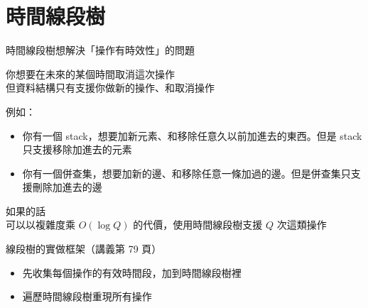 \newcommand{\InlineCode}[1]{\texttt|#1|}

\section{時間線段樹}

\iffalse

\begin{frame}{\ebtitle}
    如果要一句話解釋時間線段樹：\\
    「時間線段樹是一種用 stack 模擬 set 的辦法」

    \only<2> {
        （沒有解釋到半點 \emoji{pensive}）
    }
\end{frame}

\fi

\begin{frame}{\ebtitle}
     {
        時間線段樹想解決「操作有時效性」的問題
        
        你想要在未來的某個時間取消這次操作 \\
        但資料結構只有支援你做新的操作、和取消操作
    }

     {
        例如：
        \begin{itemize}
            \item 你有一個 stack，想要加新元素、和移除任意久以前加進去的東西。但是 stack 只支援移除加進去的元素
            \item 你有一個併查集，想要加新的邊、和移除任意一條加過的邊。但是併查集只支援刪除加進去的邊
        \end{itemize}
    }

     {
        如果的話\\
        可以以複雜度乘 $O(\log Q)$ 的代價，使用時間線段樹支援 $Q$ 次這類操作
    }
\end{frame}

\begin{frame}{\ebtitle}
    線段樹的實做框架（講義第 79 頁）

    \begin{itemize}
        \item 先收集每個操作的有效時間段，加到時間線段樹裡
        \item 遍歷時間線段樹重現所有操作
    \end{itemize}
\end{frame}

